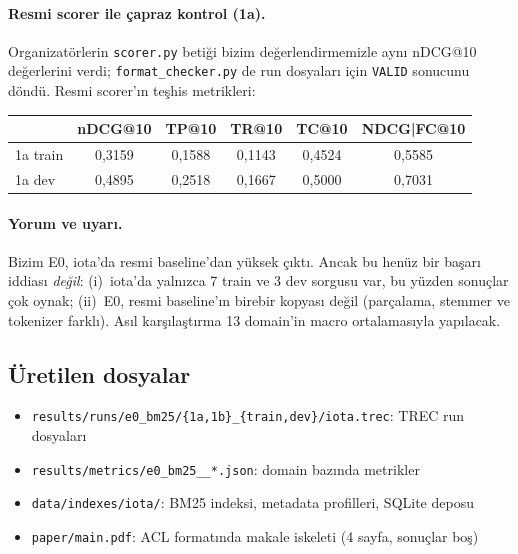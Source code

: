 \documentclass[11pt,a4paper]{article}
\begin{document}
\paragraph{Resmi scorer ile çapraz kontrol (1a).} Organizatörlerin \texttt{scorer.py} betiği
bizim değerlendirmemizle aynı nDCG@10 değerlerini verdi; \texttt{format\_checker.py} de run
dosyaları için \texttt{VALID} sonucunu döndü. Resmi scorer'ın teşhis metrikleri:

\begin{center}
\begin{tabular}{lccccc}
\toprule
& nDCG@10 & TP@10 & TR@10 & TC@10 & NDCG|FC@10 \\
\midrule
1a train & 0,3159 & 0,1588 & 0,1143 & 0,4524 & 0,5585 \\
1a dev   & 0,4895 & 0,2518 & 0,1667 & 0,5000 & 0,7031 \\
\bottomrule
\end{tabular}
\end{center}

\paragraph{Yorum ve uyarı.} Bizim E0, iota'da resmi baseline'dan yüksek çıktı. Ancak bu henüz
bir başarı iddiası \emph{değil}: (i)~iota'da yalnızca 7 train ve 3 dev sorgusu var, bu yüzden
sonuçlar çok oynak; (ii)~E0, resmi baseline'ın birebir kopyası değil (parçalama, stemmer ve
tokenizer farklı). Asıl karşılaştırma 13 domain'in macro ortalamasıyla yapılacak.

\subsection{Üretilen dosyalar}
\begin{itemize}
  \item \texttt{results/runs/e0\_bm25/\{1a,1b\}\_\{train,dev\}/iota.trec}: TREC run dosyaları
  \item \texttt{results/metrics/e0\_bm25\_\_*.json}: domain bazında metrikler
  \item \texttt{data/indexes/iota/}: BM25 indeksi, metadata profilleri, SQLite deposu
  \item \texttt{paper/main.pdf}: ACL formatında makale iskeleti (4 sayfa, sonuçlar boş)
\end{itemize}

\end{document}
